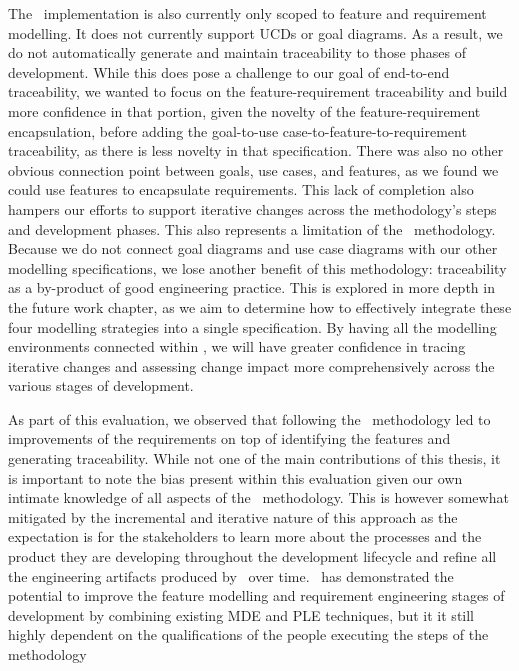 The \tool\ implementation is also currently only scoped to feature and requirement modelling. It does not currently support \gls{UCD}s or goal diagrams. As a result, we do not automatically generate and maintain traceability to those phases of development. While this does pose a challenge to our goal of end-to-end traceability, we wanted to focus on the feature-requirement traceability and build more confidence in that portion, given the novelty of the feature-requirement encapsulation, before adding the goal-to-use case-to-feature-to-requirement traceability, as there is less novelty in that specification. There was also no other obvious connection point between goals, use cases, and features, as we found we could use features to encapsulate requirements. This lack of completion also hampers our efforts to support iterative changes across the methodology's steps and development phases. This also represents a limitation of the \tool\ methodology. Because we do not connect goal diagrams and use case diagrams with our other modelling specifications, we lose another benefit of this methodology: traceability as a by-product of good engineering practice. This is explored in more depth in the future work chapter, as we aim to determine how to effectively integrate these four modelling strategies into a single specification. By having all the modelling environments connected within \tool, we will have greater confidence in tracing iterative changes and assessing change impact more comprehensively across the various stages of development.

As part of this evaluation, we observed that following the \tool\ methodology led to improvements of the requirements on top of identifying the features and generating traceability. While not one of the main contributions of this thesis, it is important to note the bias present within this evaluation given our own intimate knowledge of all aspects of the \tool\ methodology. This is however somewhat mitigated by the incremental and iterative nature of this approach as the expectation is for the stakeholders to learn more about the processes and the product they are developing throughout the development lifecycle and refine all the engineering artifacts produced by \tool\ over time. \tool\ has demonstrated the potential to improve the feature modelling and requirement engineering stages of development by combining existing \gls{MDE} and \gls{PLE} techniques, but it it still highly dependent on the qualifications of the people executing the steps of the methodology

